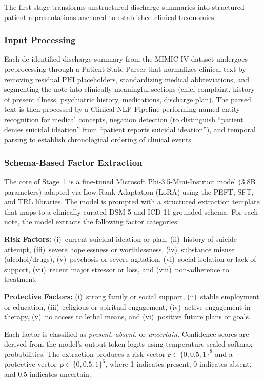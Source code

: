 \documentclass[conference]{IEEEtran}
\begin{document}
The first stage transforms unstructured discharge summaries into structured patient representations anchored to established clinical taxonomies.

\subsubsection{Input Processing}
Each de-identified discharge summary from the MIMIC-IV dataset undergoes preprocessing through a Patient State Parser that normalizes clinical text by removing residual PHI placeholders, standardizing medical abbreviations, and segmenting the note into clinically meaningful sections (chief complaint, history of present illness, psychiatric history, medications, discharge plan). The parsed text is then processed by a Clinical NLP Pipeline performing named entity recognition for medical concepts, negation detection (to distinguish ``patient denies suicidal ideation'' from ``patient reports suicidal ideation''), and temporal parsing to establish chronological ordering of clinical events.

\subsubsection{Schema-Based Factor Extraction}
The core of Stage~1 is a fine-tuned Microsoft Phi-3.5-Mini-Instruct model (3.8B parameters) adapted via Low-Rank Adaptation (LoRA) \cite{b19} using the PEFT, SFT, and TRL libraries. The model is prompted with a structured extraction template that maps to a clinically curated DSM-5 and ICD-11 grounded schema. For each note, the model extracts the following factor categories:

\textbf{Risk Factors:} (i)~current suicidal ideation or plan, (ii)~history of suicide attempt, (iii)~severe hopelessness or worthlessness, (iv)~substance misuse (alcohol/drugs), (v)~psychosis or severe agitation, (vi)~social isolation or lack of support, (vii)~recent major stressor or loss, and (viii)~non-adherence to treatment.

\textbf{Protective Factors:} (i)~strong family or social support, (ii)~stable employment or education, (iii)~religious or spiritual engagement, (iv)~active engagement in therapy, (v)~no access to lethal means, and (vi)~positive future plans or goals.

Each factor is classified as \textit{present}, \textit{absent}, or \textit{uncertain}. Confidence scores are derived from the model's output token logits using temperature-scaled softmax probabilities. The extraction produces a risk vector $\mathbf{r} \in \{0, 0.5, 1\}^{8}$ and a protective vector $\mathbf{p} \in \{0, 0.5, 1\}^{6}$, where 1 indicates present, 0 indicates absent, and 0.5 indicates uncertain.
\end{document}

